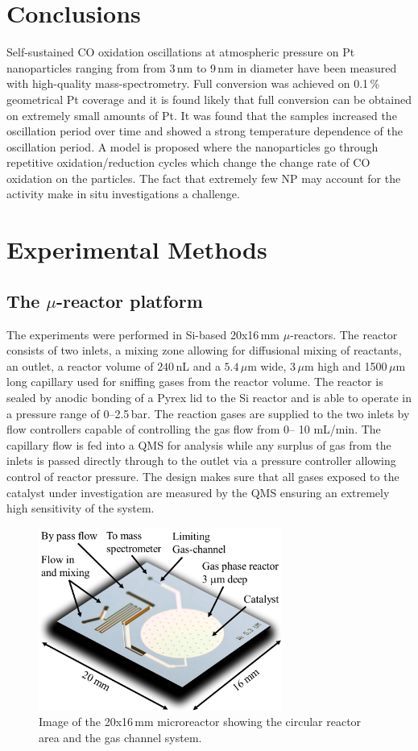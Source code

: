 \documentclass[journal=jacsat,manuscript=article]{achemso}
\begin{document}
\section{Conclusions}
Self-sustained CO oxidation oscillations at atmospheric pressure on Pt
nanoparticles ranging from from 3\,nm to 9\,nm in diameter have been measured with
high-quality mass-spectrometry. Full conversion was achieved on 0.1\,\%
geometrical Pt coverage and it is found likely that full conversion can be obtained on
extremely small amounts of Pt. It was found that the samples increased the
oscillation period over time and showed a strong temperature dependence of the
oscillation period. A model is proposed where the nanoparticles go through repetitive
oxidation/reduction cycles which change the change rate of CO oxidation on the
particles. The fact that extremely few NP may account for the activity make in
situ investigations a challenge.


\section{Experimental Methods}
\subsection{The $\mu$-reactor platform}
The experiments were performed in Si-based 20x16\,mm
$\mu$-reactors\cite{Henriksen2009}. The reactor consists of two inlets, a
mixing zone allowing for diffusional mixing of reactants, an outlet, a reactor
volume of $240\,$nL and a $5.4\,\mu$m wide, 3\,$\mu$m high and 1500\,$\mu$m
long capillary used for sniffing gases from the reactor volume. The reactor is
sealed by anodic bonding of a Pyrex lid to the Si reactor and is able to
operate in a pressure range of 0--2.5\,bar. The reaction gases are supplied to
the two inlets by flow controllers capable of controlling the gas flow from 0--
10 mL/min. The capillary flow is fed into a QMS
for analysis while any surplus of gas from the inlets is passed directly
through to the outlet via a pressure controller allowing control of reactor
pressure. The design makes sure that all gases exposed to the catalyst under
investigation are measured by the QMS ensuring an extremely high sensitivity of
the system. 

\begin{figure}
 \includegraphics[width=8cm]{Ib-reactor.png}
 \caption{Image of the 20x16\,mm microreactor showing the circular reactor area
and the gas channel system.}
  \label{fgr:reactor}
\end{figure}
\end{document}
